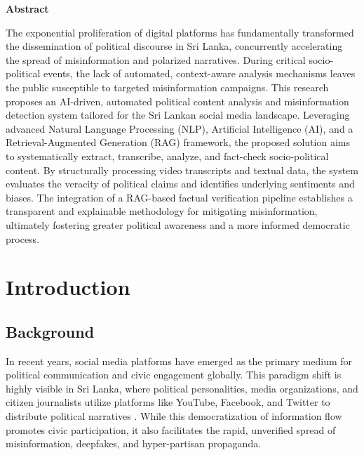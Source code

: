 \documentclass[12pt,a4paper]{report}
\begin{document}
\newpage
\begin{center}
    \Large \textbf{Abstract}
\end{center}
\vspace{0.5cm}
The exponential proliferation of digital platforms has fundamentally transformed the dissemination of political discourse in Sri Lanka, concurrently accelerating the spread of misinformation and polarized narratives. During critical socio-political events, the lack of automated, context-aware analysis mechanisms leaves the public susceptible to targeted misinformation campaigns. This research proposes an AI-driven, automated political content analysis and misinformation detection system tailored for the Sri Lankan social media landscape. Leveraging advanced Natural Language Processing (NLP), Artificial Intelligence (AI), and a Retrieval-Augmented Generation (RAG) framework, the proposed solution aims to systematically extract, transcribe, analyze, and fact-check socio-political content. By structurally processing video transcripts and textual data, the system evaluates the veracity of political claims and identifies underlying sentiments and biases. The integration of a RAG-based factual verification pipeline establishes a transparent and explainable methodology for mitigating misinformation, ultimately fostering greater political awareness and a more informed democratic process.
\vspace{1cm}

\tableofcontents
\newpage
\onehalfspacing

\setcounter{chapter}{0}
\chapter{Introduction}

\section{Background}
In recent years, social media platforms have emerged as the primary medium for political communication and civic engagement globally. This paradigm shift is highly visible in Sri Lanka, where political personalities, media organizations, and citizen journalists utilize platforms like YouTube, Facebook, and Twitter to distribute political narratives \cite{allcott2017}. While this democratization of information flow promotes civic participation, it also facilitates the rapid, unverified spread of misinformation, deepfakes, and hyper-partisan propaganda. 
\end{document}
